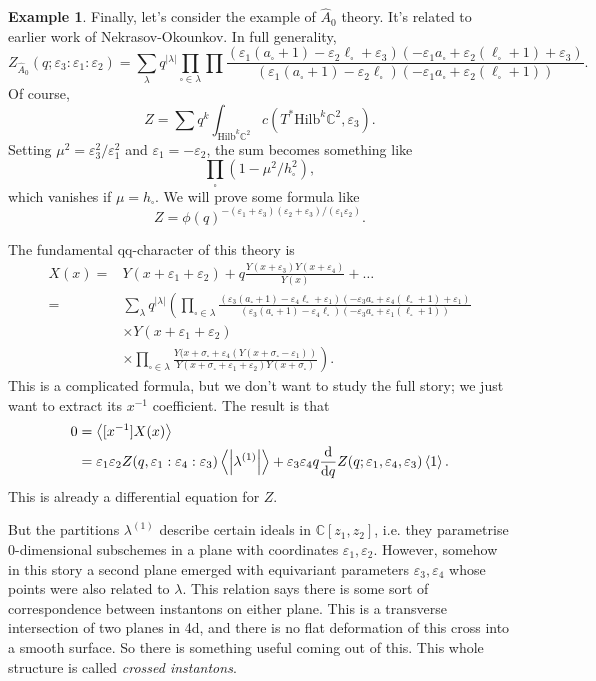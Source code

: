 \documentclass[leqno, openany]{memoir}
\theoremstyle{definition}
\newtheorem{exm}[thm]{Example}
\theoremstyle{remark}
\theoremstyle{plain}
\theoremstyle{definition}
\theoremstyle{remark}
\newcommand{\ep}{\varepsilon}
\newcommand{\mr}[1]{\mathrm{#1}}
\begin{document}
\begin{exm}
Finally, let's consider the example of $\widehat{A}_0$ theory. It's related to earlier work of Nekrasov-Okounkov.
In full generality, 
\[
Z_{\widehat{A}_0}(q; \ep_3:\ep_1 : \ep_2) = \sum_\lambda  q^{|\lambda|} \prod_{\square \in \lambda} \prod \frac{(\ep_1(a_\square + 1) - \ep_2 \ell_\square + \ep_3)(-\ep_1 a_\square + \ep_2(\ell_\square + 1) + \ep_3)}{(\ep_1(a_\square + 1) - \ep_2 \ell_\square)(-\ep_1 a_\square + \ep_2(\ell_\square + 1))}.
\]
Of course, 
\[
    Z = \sum q^k \int_{\mr{Hilb}^k \mathbb{C}^2} c(T^* \mr{Hilb}^k \mathbb{C}^2,\ep_3).
\]
Setting $\mu^2 = \ep_3^2/\ep_1^2$ and $\ep_1 = - \ep_2$, the sum becomes something like 
\[
\prod_\square (1 - \mu^2/h_\square^2),
\]
which vanishes if $\mu = h_\square$. 
We will prove some formula like 
\[
Z = \phi(q)^{-(\ep_1 + \ep_3)(\ep_2 + \ep_3)/(\ep_1 \ep_2)}.
\]

The fundamental qq-character of this theory is 
\begin{align*}
    X(x) ={}& Y(x + \ep_1 + \ep_2) + q\frac{Y(x + \ep_3)Y(x + \ep_4)}{Y(x)} + \dots \\ 
    ={}& \sum_\lambda q^{|\lambda|} \left( \prod_{\square \in \lambda} \frac{(\ep_3 (a_\square +1) - \ep_4 \ell_\square + \ep_1)(-\ep_3 a_\square + \ep_4(\ell_\square + 1) + \ep_1)}{(\ep_3(a_\square + 1) - \ep_4 \ell_\square)(-\ep_3 a_\square + \ep_1(\ell_\square + 1))} \right. \\
    &\times Y(x + \ep_1 + \ep_2)  \\
    &\times \left. \prod_{\square \in \lambda}\frac{Y(x + \sigma_\square + \ep_4(Y(x + \sigma_\square - \ep_1))}{Y(x + \sigma_\square + \ep_1 + \ep_2) Y(x + \sigma_\square)} \right).
\end{align*}
This is a complicated formula, but we don't want to study the full story; we just want to extract its $x^{-1}$ coefficient. 
The result is that 
\begin{align*}
    0 &= \ev{[x^{-1}] X(x) } \\
    &= \ep_1 \ep_2 Z(q, \ep_1 : \ep_4 : \ep_3)\ev{\abs{\lambda^{(1)}} }+ \ep_3 \ep_4 q \dv{q} Z(q; \ep_1,\ep_4,\ep_3) \ev{1}.
\end{align*}
This is already a differential equation for $Z$. 

But the partitions $\lambda^{(1)}$ describe certain ideals in $\mathbb{C}{[z_1,z_2]}$, i.e. they parametrise $0$-dimensional subschemes in 
a plane with coordinates $\ep_1,\ep_2$. 
However, somehow in this story a second plane emerged with equivariant parameters $\ep_3,\ep_4$ whose points were also related to $\lambda$.
This relation says there is some sort of correspondence between instantons on either plane. 
This is a transverse intersection of two planes in 4d, and there is no flat deformation of this cross into a smooth surface. 
So there is something useful coming out of this. This whole structure is called \emph{crossed instantons}.


\end{exm}
\end{document}
